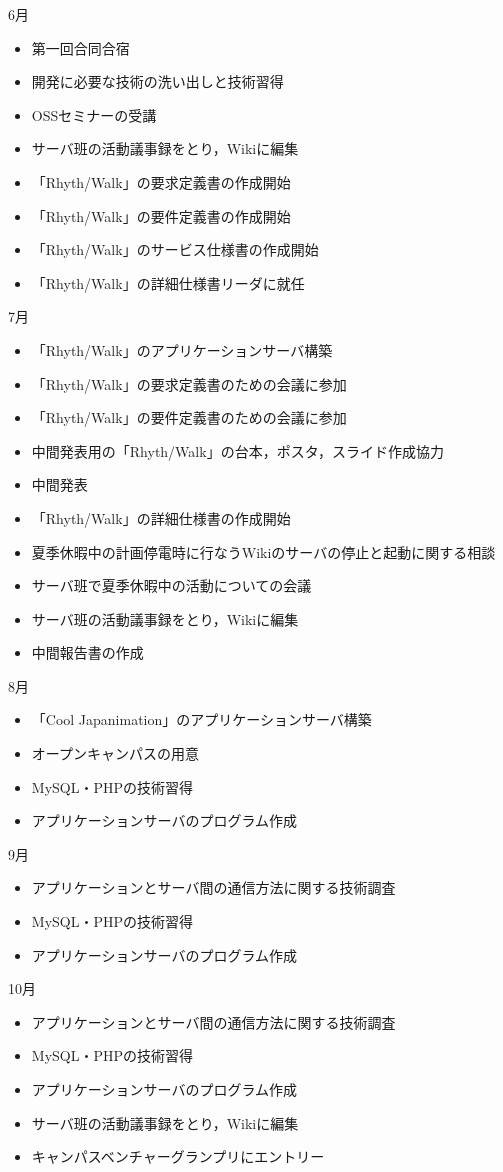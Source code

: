 6月
\begin{itemize}
\item 第一回合同合宿
\item 開発に必要な技術の洗い出しと技術習得
\item OSSセミナーの受講
\item サーバ班の活動議事録をとり，Wikiに編集
\item 「Rhyth/Walk」の要求定義書の作成開始
\item 「Rhyth/Walk」の要件定義書の作成開始
\item 「Rhyth/Walk」のサービス仕様書の作成開始
\item 「Rhyth/Walk」の詳細仕様書リーダに就任
\end{itemize}
7月
\begin{itemize}
\item 「Rhyth/Walk」のアプリケーションサーバ構築
\item 「Rhyth/Walk」の要求定義書のための会議に参加
\item 「Rhyth/Walk」の要件定義書のための会議に参加
\item 中間発表用の「Rhyth/Walk」の台本，ポスタ，スライド作成協力
\item 中間発表
\item 「Rhyth/Walk」の詳細仕様書の作成開始
\item 夏季休暇中の計画停電時に行なうWikiのサーバの停止と起動に関する相談
\item サーバ班で夏季休暇中の活動についての会議
\item サーバ班の活動議事録をとり，Wikiに編集
\item 中間報告書の作成
\end{itemize}
8月
\begin{itemize}
\item 「Cool Japanimation」のアプリケーションサーバ構築
\item オープンキャンパスの用意
\item MySQL・PHPの技術習得
\item アプリケーションサーバのプログラム作成
\end{itemize}
9月
\begin{itemize}
\item アプリケーションとサーバ間の通信方法に関する技術調査
\item MySQL・PHPの技術習得
\item アプリケーションサーバのプログラム作成
\end{itemize}
10月
\begin{itemize}
\item アプリケーションとサーバ間の通信方法に関する技術調査
\item MySQL・PHPの技術習得
\item アプリケーションサーバのプログラム作成
\item サーバ班の活動議事録をとり，Wikiに編集
\item キャンパスベンチャーグランプリにエントリー
\end{itemize}
